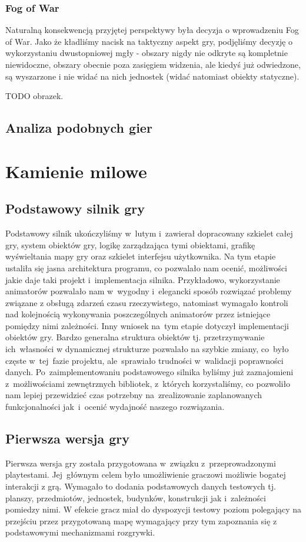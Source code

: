 \documentclass[licencjacka]{pracamgr}
\begin{document}
    \subsection{Fog of War}
    Naturalną konsekwencją przyjętej perspektywy była decyzja o wprowadzeniu Fog of War. Jako że kładliśmy nacisk na
    taktyczny aspekt gry, podjęliśmy decyzję o wykorzystaniu dwustopniowej mgły - obszary nigdy nie odkryte są
    kompletnie niewidoczne, obszary obecnie poza zasięgiem widzenia, ale kiedyś już odwiedzone, są wyszarzone i nie
    widać na nich jednostek (widać natomiast obiekty statyczne).

    TODO obrazek.

  \section{Analiza podobnych gier}

  \chapter{Kamienie milowe}
    \section{Podstawowy silnik gry}
    Podstawowy silnik ukończyliśmy w~lutym i~zawierał dopracowany szkielet całej gry, system obiektów gry,
    logikę zarządzająca tymi obiektami, grafikę wyświeltania mapy gry oraz szkielet interfejsu użytkownika.
    Na tym etapie ustaliła się jasna architektura programu, co pozwalało nam ocenić, możliwości jakie
    daje taki projekt i~implementacja silnika. Przykładowo, wykorzystanie animatorów pozwalało nam w~wygodny
    i~elegancki sposób rozwiązać problemy związane z obsługą zdarzeń czasu rzeczywistego, natomiast wymagało kontroli
    nad kolejnością wykonywania poszczególnych animatorów przez istniejące pomiędzy nimi zależności. Inny wniosek
    na~tym etapie dotyczył implementacji obiektów gry. Bardzo generalna struktura obiektów tj. przetrzymywanie
    ich~własności w dynamicznej strukturze pozwalało na szybkie zmiany, co~było częste w~tej~fazie projektu,
    ale~sprawiało trudności w~walidacji poprawności danych.
    Po~zaimplementowaniu podstawowego silnika byliśmy już zaznajomieni z~możliwościami zewnętrznych bibliotek,
    z~których korzystaliśmy, co pozwoliło nam lepiej przewidzieć czas potrzebny na~zrealizowanie zaplanowanych
    funkcjonalności jak~i~ocenić wydajność naszego rozwiązania.

    \section{Pierwsza wersja gry}
    Pierwsza wersja gry została przygotowana w~związku z~przeprowadzonymi playtestami. Jej~głównym celem było
    umożliwienie graczowi możliwie bogatej interakcji z grą. Wymagało to dodania podstawowych
    danych testowych tj. planszy, przedmiotów, jednostek, budynków, konstrukcji jak i~zależności pomiedzy nimi.
    W efekcie gracz miał do dyspozycji testowy poziom polegający na przejściu przez przygotowaną mapę wymagający
    przy tym zapoznania się z podstawowymi mechanizmami rozgrywki.
\end{document}
